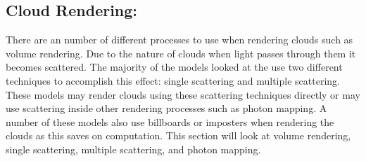 \subsection{Cloud Rendering:}
\label{sec:cr}
There are an number of different processes to use when rendering clouds such as volume rendering.
Due to the nature of clouds when light passes through them it becomes scattered.
The majority of the models looked at the use two different techniques to accomplish this effect: single scattering and multiple scattering.
These models may render clouds using these scattering techniques directly or may use scattering inside other rendering processes such as photon mapping.
A number of these models also use billboards or imposters when rendering the clouds as this saves on computation.
This section will look at volume rendering, single scattering, multiple scattering, and photon mapping.




